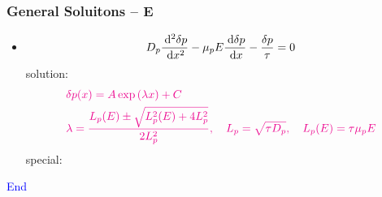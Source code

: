 \documentclass{beamer}
\begin{document}
    \begin{frame} \frametitle{General Soluitons -- E}
        \begin{itemize}
            \item \begin{equation*}
                    D_p \frac{\: \mathrm{d}^2 \delta p}{\: \mathrm{d} x^2} - \mu_p E \frac{\: \mathrm{d} \delta p}{\: \mathrm{d} x} - \frac{\delta p}{\tau} = 0 
                \end{equation*}
                solution:
                \begin{equation*}
                    \color{magenta}
                    \begin{aligned}
                        & \delta p(x) = A \exp\left( \lambda x \right) + C \\
                        & \lambda = \frac{L_p(E) \pm \sqrt{L_p^2 (E) + 4 L_p^2}}{2 L_p^2},\quad L_p = \sqrt{\tau D_p},\quad L_p(E) = \tau \mu_p E
                    \end{aligned}
                \end{equation*}
                special:
                \begin{minipage}{\linewidth}
                \end{minipage}
        \end{itemize}
    \end{frame}

    \begin{frame} 
        \begin{center}
            \Large\textcolor{blue}{End}
        \end{center}
    \end{frame}
\end{document}
